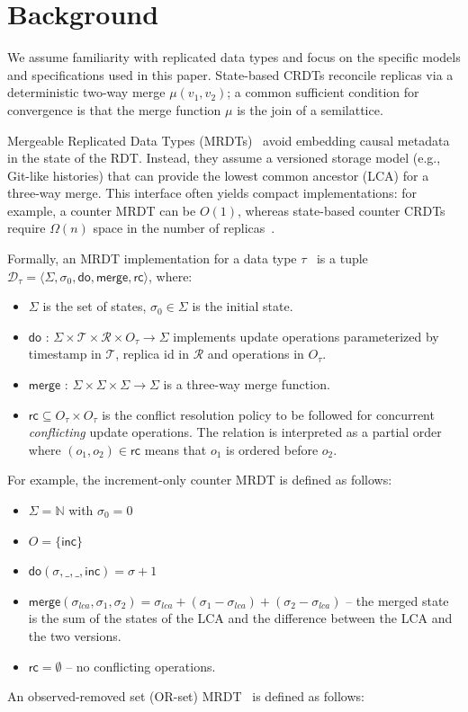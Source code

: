 \documentclass[sigplan,twocolumn,accept]{acmart}
\newcommand{\F}[1]{\mathsf{#1}}
\begin{document}
\section{Background}
\label{sec:background}

We assume familiarity with replicated data types and focus on the specific
models and specifications used in this paper. State-based CRDTs reconcile
replicas via a deterministic two-way merge $\mu(v_1, v_2)$; a common sufficient
condition for convergence is that the merge function $\mu$ is the join of a
semilattice.

Mergeable Replicated Data Types (MRDTs)~\cite{MRDT} avoid embedding causal
metadata in the state of the RDT. Instead, they assume a versioned storage model
(e.g., Git-like histories) that can provide the lowest common ancestor (LCA) for
a three-way merge. This interface often yields compact implementations: for
example, a counter MRDT can be $O(1)$, whereas state-based counter CRDTs require
$\Omega(n)$ space in the number of replicas~\cite{Burckhardt}.

Formally, an MRDT implementation for a data type $\tau$~\citep{Neem} is a tuple
$\mathcal{D}_{\tau} = \langle \Sigma, \sigma_0, \F{do}, \F{merge}, \F{rc} \rangle$, where:
\begin{itemize}
	\item $\Sigma$ is the set of states, $\sigma_0 \in \Sigma$ is the initial state.
    \item $\F{do}$ : $\Sigma \times \mathcal{T} \times \mathcal{R} \times O_{\tau} \rightarrow \Sigma$ implements update operations parameterized by timestamp in $\mathcal{T}$, replica id in $\mathcal{R}$ and operations in $O_{\tau}$.
	\item $\F{merge}$ : $\Sigma \times \Sigma \times \Sigma \rightarrow \Sigma$ is a three-way merge function.
	\item $\F{rc} \subseteq O_{\tau} \times O_{\tau}$ is the conflict resolution policy to be followed for concurrent \emph{conflicting} update operations. The relation is interpreted as a partial order where $(o_1, o_2) \in \F{rc}$ means that $o_1$ is ordered before $o_2$.
\end{itemize}

For example, the increment-only counter MRDT is defined as follows:

\begin{itemize}
    \item $\Sigma = \mathbb{N}$ with $\sigma_0 = 0$
    \item $O = \{\F{inc}\}$
    \item $\F{do}(\sigma,\_,\_,\F{inc}) = \sigma+1$
    \item $\F{merge}(\sigma_{lca},\sigma_1,\sigma_2) = \sigma_{lca} + (\sigma_{1} - \sigma_{lca}) + (\sigma_2 - \sigma_{lca})$ -- the merged state is the sum of the states of the LCA and the difference between the LCA and the two versions.
    \item $\F{rc} = \emptyset$ -- no conflicting operations.
\end{itemize}
An observed-removed set (OR-set) MRDT~\cite{MRDT} is defined as follows:
\end{document}

